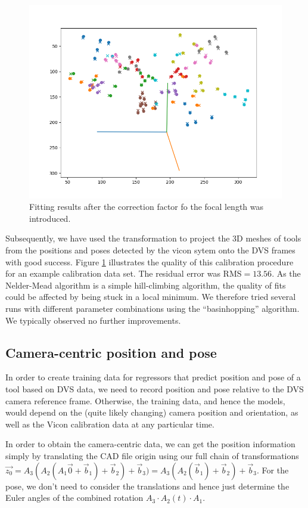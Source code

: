 \documentclass{article}
\begin{document}
\begin{figure}
  \includegraphics[width=\textwidth]{figure_match_euler.png}
  \caption{\label{figure3} Fitting results after the correction factor fo the focal length was introduced.}
\end{figure}

Subsequently, we have used the transformation to project the 3D meshes of tools from the positions and poses detected by the vicon sytem onto the DVS frames with good success. Figure \ref{figure3} illustrates the quality of this calibration procedure for an example calibration data set. The residual error was RMS$= 13.56$.
 As the Nelder-Mead algorithm is a simple hill-climbing algorithm, the quality of fits could be affected by being stuck in a local minimum. We therefore tried several runs with different parameter combinations using the ``basinhopping'' algorithm. We typically observed no further improvements.

\subsection{Camera-centric position and pose}
In order to create training data for regressors that predict position and pose of a tool based on DVS data, we need to record position and pose relative to the DVS camera reference frame. Otherwise, the training data, and hence the models, would depend on the (quite likely changing) camera position and orientation, as well as the Vicon calibration data at any particular time.

In order to obtain the camera-centric data, we can get the position information simply by translating the CAD file origin using our full chain of transformations $\vec{z_0}= A_3(A_2(A_1 \vec{0}+ \vec{b}_1)+\vec{b}_2)+\vec{b}_3)= A_3(A_2(\vec{b}_1)+\vec{b}_2)+\vec{b}_3$. For the pose, we don't need to consider the translations and hence just determine the Euler angles of the combined rotation $A_3 \cdot A_2(t) \cdot A_1$.
\end{document}

